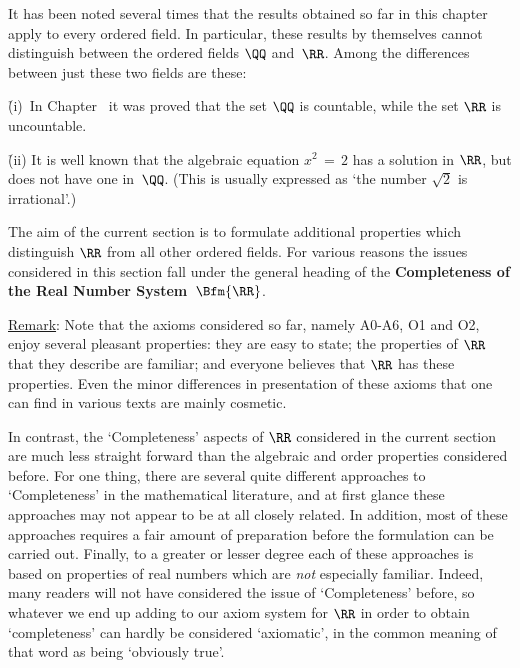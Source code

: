 \V

        It has been noted several times that the results obtained so far in this chapter apply to every ordered field.
    In particular, these results by themselves cannot distinguish between the ordered fields ${\QQ}$ and~${\RR}$.
    Among the differences between just these two fields are these:

\VA
        \h (i)\, In Chapter~ it was proved that the set ${\QQ}$ is countable, while the set ${\RR}$ is uncountable.

        \h (ii) It is well known that the algebraic equation $x^{2} \,=\, 2$ has a solution in ${\RR}$, but does not have one in~${\QQ}$.
    (This is usually expressed as `the number $\sqrt{2}$ is irrational'.)


\VA

        The aim of the current section is to formulate additional properties which distinguish ${\RR}$ from all other ordered fields.
    For various reasons the issues considered in this section fall under the general heading of
    the {\bf Completeness of the Real Number System~$\Bfm{{\RR}}$}.

\V

        \underline{Remark}: Note that the axioms considered so far, namely A0-A6, O1 and O2, enjoy several pleasant properties:
    they are easy to state; the properties of ${\RR}$ that they describe are familiar; and everyone believes that ${\RR}$ has these properties.
    Even the minor differences in presentation of these axioms that one can find in various texts are mainly cosmetic.

        In contrast, the `Completeness' aspects of ${\RR}$ considered in the current section
     are much less straight forward than the algebraic and order properties considered before.
    For one thing, there are several quite different approaches to `Completeness' in the mathematical literature,
    and at first glance these approaches may not appear to be at all closely related.
    In addition, most of these approaches requires a fair amount of preparation before the formulation can be carried out.
    Finally, to a greater or lesser degree each of these approaches is based on properties of real numbers which are {\em not} especially familiar.
    Indeed, many readers will not have considered the issue of `Completeness' before,
    so whatever we end up adding to our axiom system for ${\RR}$ in order to obtain `completeness' can hardly be considered `axiomatic',
    in the common meaning of that word as being `obviously true'.

